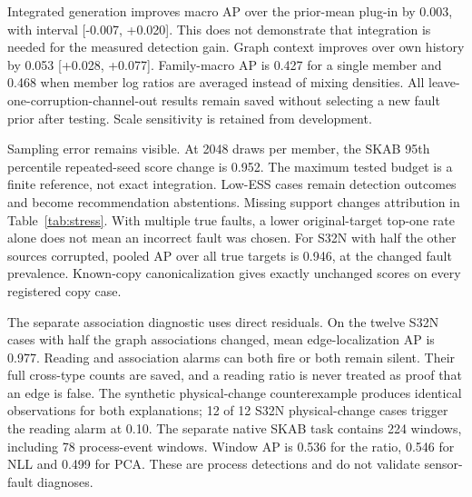 Integrated generation improves macro AP over the prior-mean plug-in by 0.003, with interval [-0.007, +0.020]. This does not demonstrate that integration is needed for the measured detection gain. Graph context improves over own history by 0.053 [+0.028, +0.077]. Family-macro AP is 0.427 for a single member and 0.468 when member log ratios are averaged instead of mixing densities. All leave-one-corruption-channel-out results remain saved without selecting a new fault prior after testing. Scale sensitivity is retained from development.

Sampling error remains visible. At 2048 draws per member, the SKAB 95th percentile repeated-seed score change is 0.952. The maximum tested budget is a finite reference, not exact integration. Low-ESS cases remain detection outcomes and become recommendation abstentions. Missing support changes attribution in Table~\ref{tab:stress}. With multiple true faults, a lower original-target top-one rate alone does not mean an incorrect fault was chosen. For S32N with half the other sources corrupted, pooled AP over all true targets is 0.946, at the changed fault prevalence. Known-copy canonicalization gives exactly unchanged scores on every registered copy case.

The separate association diagnostic uses direct residuals. On the twelve S32N cases with half the graph associations changed, mean edge-localization AP is 0.977. Reading and association alarms can both fire or both remain silent. Their full cross-type counts are saved, and a reading ratio is never treated as proof that an edge is false. The synthetic physical-change counterexample produces identical observations for both explanations; 12 of 12 S32N physical-change cases trigger the reading alarm at 0.10. The separate native SKAB task contains 224 windows, including 78 process-event windows. Window AP is 0.536 for the ratio, 0.546 for NLL and 0.499 for PCA. These are process detections and do not validate sensor-fault diagnoses.
